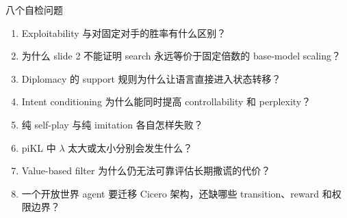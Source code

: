 \begin{importantbox}{八个自检问题}
\begin{enumerate}
  \item Exploitability 与对固定对手的胜率有什么区别？
  \item 为什么 slide 2 不能证明 search 永远等价于固定倍数的 base-model scaling？
  \item Diplomacy 的 support 规则为什么让语言直接进入状态转移？
  \item Intent conditioning 为什么能同时提高 controllability 和 perplexity？
  \item 纯 self-play 与纯 imitation 各自怎样失败？
  \item piKL 中 $\lambda$ 太大或太小分别会发生什么？
  \item Value-based filter 为什么仍无法可靠评估长期撒谎的代价？
  \item 一个开放世界 agent 要迁移 Cicero 架构，还缺哪些 transition、reward 和权限边界？
\end{enumerate}
\end{importantbox}


